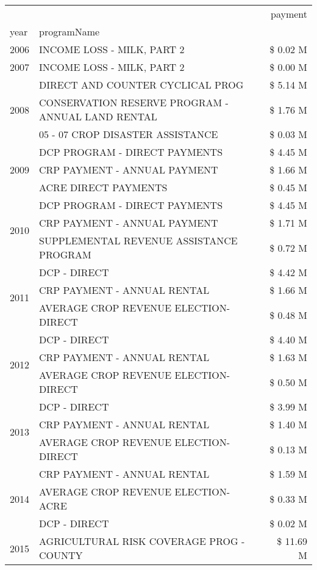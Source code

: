 \begin{tabular}{llr}
\toprule
 &  & payment \\
year & programName &  \\
\midrule
2006 & INCOME LOSS - MILK, PART 2 & \$ 0.02 M \\
\cline{1-3}
2007 & INCOME LOSS - MILK, PART 2 & \$ 0.00 M \\
\cline{1-3}
\multirow[t]{3}{*}{2008} & DIRECT AND COUNTER CYCLICAL PROG & \$ 5.14 M \\
 & CONSERVATION RESERVE PROGRAM - ANNUAL LAND RENTAL & \$ 1.76 M \\
 & 05 - 07 CROP DISASTER ASSISTANCE & \$ 0.03 M \\
\cline{1-3}
\multirow[t]{3}{*}{2009} & DCP PROGRAM - DIRECT PAYMENTS & \$ 4.45 M \\
 & CRP PAYMENT - ANNUAL PAYMENT & \$ 1.66 M \\
 & ACRE DIRECT PAYMENTS & \$ 0.45 M \\
\cline{1-3}
\multirow[t]{3}{*}{2010} & DCP PROGRAM - DIRECT PAYMENTS & \$ 4.45 M \\
 & CRP PAYMENT - ANNUAL PAYMENT & \$ 1.71 M \\
 & SUPPLEMENTAL REVENUE ASSISTANCE PROGRAM & \$ 0.72 M \\
\cline{1-3}
\multirow[t]{3}{*}{2011} & DCP - DIRECT & \$ 4.42 M \\
 & CRP PAYMENT - ANNUAL RENTAL & \$ 1.66 M \\
 & AVERAGE CROP REVENUE ELECTION-DIRECT & \$ 0.48 M \\
\cline{1-3}
\multirow[t]{3}{*}{2012} & DCP - DIRECT & \$ 4.40 M \\
 & CRP PAYMENT - ANNUAL RENTAL & \$ 1.63 M \\
 & AVERAGE CROP REVENUE ELECTION-DIRECT & \$ 0.50 M \\
\cline{1-3}
\multirow[t]{3}{*}{2013} & DCP - DIRECT & \$ 3.99 M \\
 & CRP PAYMENT - ANNUAL RENTAL & \$ 1.40 M \\
 & AVERAGE CROP REVENUE ELECTION-DIRECT & \$ 0.13 M \\
\cline{1-3}
\multirow[t]{3}{*}{2014} & CRP PAYMENT - ANNUAL RENTAL & \$ 1.59 M \\
 & AVERAGE CROP REVENUE ELECTION-ACRE & \$ 0.33 M \\
 & DCP - DIRECT & \$ 0.02 M \\
\cline{1-3}
\multirow[t]{2}{*}{2015} & AGRICULTURAL RISK COVERAGE PROG - COUNTY & \$ 11.69 M \\

\end{tabular}
